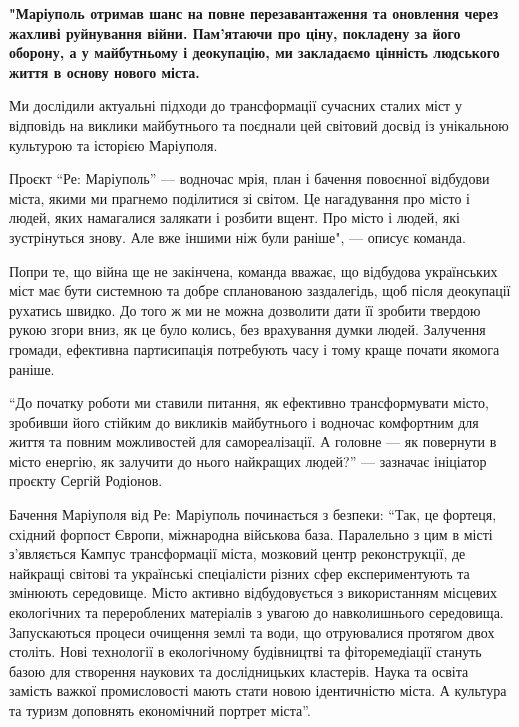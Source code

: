 \begin{leftbar}
\begingroup
\bfseries
"Маріуполь отримав шанс на повне перезавантаження та оновлення через
жахливі руйнування війни. Пам'ятаючи про ціну, покладену за його оборону, а у
майбутньому і деокупацію, ми закладаємо цінність людського життя в основу
нового міста. 

Ми дослідили актуальні підходи до трансформації сучасних сталих міст у
відповідь на виклики майбутнього та поєднали цей світовий досвід із унікальною
культурою та історією Маріуполя.

Проєкт \enquote{Ре: Маріуполь} — водночас мрія, план і бачення повоєнної відбудови
міста, якими ми прагнемо поділитися зі світом. Це нагадування про місто і
людей, яких намагалися залякати і розбити вщент. Про місто і людей, які
зустрінуться знову. Але вже іншими ніж були раніше", — описує команда.
\endgroup
\end{leftbar}

Попри те, що війна ще не закінчена, команда вважає, що відбудова українських
міст має бути системною та добре спланованою заздалегідь, щоб після деокупації
рухатись швидко. До того ж ми не можна дозволити дати її зробити твердою рукою
згори вниз, як це було колись, без врахування думки людей. Залучення громади,
ефективна партисипація потребують часу і тому краще почати якомога раніше.

\enquote{До початку роботи ми ставили питання, як ефективно трансформувати місто,
зробивши його стійким до викликів майбутнього і водночас комфортним для життя
та повним можливостей для самореалізації. А головне — як повернути в місто
енергію, як залучити до нього найкращих людей?} — зазначає ініціатор проєкту
Сергій Родіонов.

Бачення Маріуполя від Ре: Маріуполь починається з безпеки: \enquote{Так, це фортеця,
східний форпост Європи, міжнародна військова база. Паралельно з цим в місті
з'являється Кампус трансформації міста, мозковий центр реконструкції, де
найкращі світові та українські спеціалісти різних сфер експериментують та
змінюють середовище. Місто активно відбудовується з використанням місцевих
екологічних та перероблених матеріалів з увагою до навколишнього середовища.
Запускаються процеси очищення землі та води, що отруювалися протягом двох
століть. Нові технології в екологічному будівництві та фіторемедіації стануть
базою для створення наукових та дослідницьких кластерів. Наука та освіта
замість важкої промисловості мають стати новою ідентичністю міста. А культура
та туризм доповнять економічний портрет міста}.

